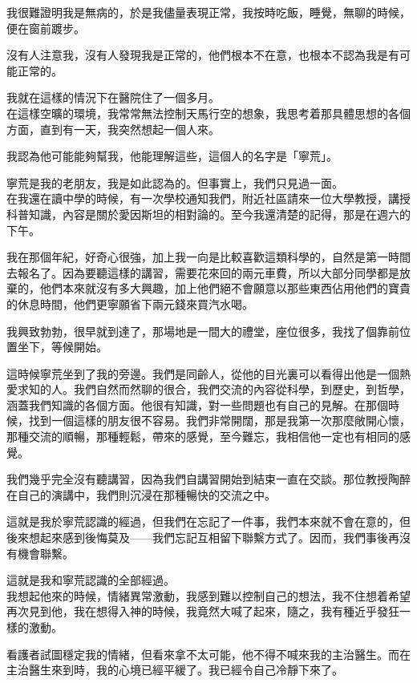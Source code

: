 我很難證明我是無病的，於是我儘量表現正常，我按時吃飯，睡覺，無聊的時候，便在窗前踱步。

沒有人注意我，沒有人發現我是正常的，他們根本不在意，也根本不認為我是有可能正常的。

我就在這樣的情況下在醫院住了一個多月。
\\


在這樣空曠的環境，我常常無法控制天馬行空的想象，我思考着那具體思想的各個方面，直到有一天，我突然想起一個人來。

我認為他可能能夠幫我，他能理解這些，這個人的名字是「寧荒」。

寧荒是我的老朋友，我是如此認為的。但事實上，我們只見過一面。
\\

在我還在讀中學的時候，有一次學校通知我們，附近社區請來一位大學教授，講授科普知識，內容是關於愛因斯坦的相對論的。至今我還清楚的記得，那是在週六的下午。

我在那個年紀，好奇心很強，加上我一向是比較喜歡這類科學的，自然是第一時間去報名了。因為要聽這樣的講習，需要花來回的兩元車費，所以大部分同學都是放棄的，他們本來就沒有多大興趣，加上他們絕不會願意以那些東西佔用他們的寶貴的休息時間，他們更寧願省下兩元錢來買汽水喝。

我興致勃勃，很早就到達了，那場地是一間大的禮堂，座位很多，我找了個靠前位置坐下，等候開始。

這時候寧荒坐到了我的旁邊。我們是同齡人，從他的目光裏可以看得出他是一個熱愛求知的人。我們自然而然聊的很合，我們交流的內容從科學，到歷史，到哲學，涵蓋我們知識的各個方面。他很有知識，對一些問題也有自己的見解。在那個時候，找到一個這樣的朋友很不容易。我們非常開闊，那是我第一次那麼敞開心懷，那種交流的順暢，那種輕鬆，帶來的感覺，至今難忘，我相信他一定也有相同的感覺。

我們幾乎完全沒有聽講習，因為我們自講習開始到結束一直在交談。那位教授陶醉在自己的演講中，我們則沉浸在那種暢快的交流之中。

這就是我於寧荒認識的經過，但我們在忘記了一件事，我們本來就不會在意的，但後來想起來感到後悔莫及——我們忘記互相留下聯繫方式了。因而，我們事後再沒有機會聯繫。

這就是我和寧荒認識的全部經過。
\\


我想起他來的時候，情緒異常激動，我感到難以控制自己的想法，我不住想着希望再次見到他，我在想得入神的時候，我竟然大喊了起來，隨之，我有種近乎發狂一樣的激動。

看護者試圖穩定我的情緒，但看來拿不太可能，他不得不喊來我的主治醫生。而在主治醫生來到時，我的心境已經平緩了。我已經令自己冷靜下來了。

